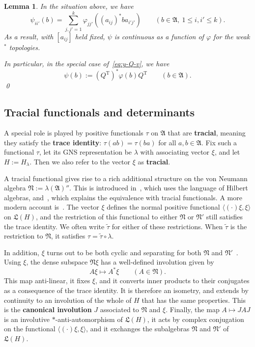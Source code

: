 \documentclass[12pt,a4paper]{article}
\numberwithin{equation}{section}
\newtheorem{lem}[thm]{Lemma}
\theoremstyle{remark}
\renewcommand{\rm}[1]{\mathrm{#1}}
\newcommand{\A}{\mathfrak{A}}
\newcommand{\frL}{\mathfrak{L}}
\newcommand{\N}{\mathfrak{N}}
\renewcommand{\phi}{\varphi}
\renewcommand{\l}{\lambda}
\renewcommand{\t}[1]{\widetilde{#1}}
\begin{document}
\begin{lem}\label{lem:new-type}
In the situation above, we have
\begin{equation}\label{eq:new-type}
\psi_{ii'}(b) = \sum_{j,j'=1}^k \phi_{jj'}((a_{ij})^\ast ba_{i'j'}) \qquad (b \in \A,\ 1\le i,i'\le k).
\end{equation}
As a result, with $[a_{ij}]$ held fixed, $\psi$ is continuous as a function of $\phi$ for the weak$^\ast$ topologies.

In particular, in the special case of~\eqref{eq:y-Q-v}, we have
	\begin{equation}\label{eq:psi-Q-phi}
\psi(b) := (Q^\rm{T})^\ast\phi(b)Q^\rm{T} \qquad (b \in \A).
	\end{equation}
\qed
\end{lem}






\subsection{Tracial functionals and determinants}\label{subs:tracial}

A special role is played by positive functionals $\tau$ on $\A$ that are \textbf{tracial}, meaning they satisfy the \textbf{trace identity}: $\tau(ab) = \tau(ba)$ for all $a,b \in \A$. Fix such a functional $\tau$, let its GNS representation be $\l$ with associating vector $\xi$, and let $H := H_\l$.  Then we also refer to the vector $\xi$ as \textbf{tracial}.

A tracial functional gives rise to a rich additional structure on the von Neumann algebra $\N := \l(\A)''$.  This is introduced in~\cite[Chap. I.5]{Dix--vN}, which uses the language of Hilbert algebras, and~\cite[Chap. I.6]{Dix--vN}, which explains the equivalence with tracial functionals.  A more modern account is~\cite[App. F]{BroOza08}.  The vector $\xi$ defines the normal positive functional $\langle (\cdot)\xi,\xi\rangle$ on $\frL(H)$, and the restriction of this functional to either $\N$ or $\N'$ still satisfies the trace identity.  We often write $\t{\tau}$ for either of these restrictions.  When $\t{\tau}$ is the restriction to $\N$, it satisfies $\tau = \t{\tau}\circ \l$.

In addition, $\xi$ turns out to be both cyclic and separating for both $\N$ and $\N'$~\cite[Cor. I.6.1 and Prop. I.1.5]{Dix--vN}.  Using $\xi$, the dense subspace $\N\xi$ has a well-defined involution given by
\begin{equation}\label{eq:canonical-involution}
	A\xi \mapsto A^\ast \xi \qquad (A \in \N).
\end{equation}
This map anti-linear, it fixes $\xi$, and it converts inner products to their conjugates as a consequence of the trace identity.  It is therefore an isometry, and extends by continuity to an involution of the whole of $H$ that has the same properties.  This is the \textbf{canonical involution} $J$ associated to $\N$ and $\xi$.  Finally, the map $A\mapsto JAJ$ is an involutive $\ast$-anti-automorphism of $\frL(H)$, it acts by complex conjugation on the functional $\langle(\cdot)\xi,\xi\rangle$, and it exchanges the subalgebras $\N$ and $\N'$ of $\frL(H)$.
\end{document}
